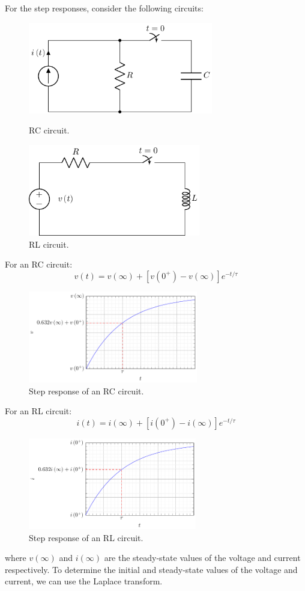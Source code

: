 \documentclass{article}
\begin{document}
For the step responses, consider the following circuits:
\begin{figure}[H]
    \centering
    \includegraphics[height = 4cm]{figures/rc_step.pdf}
    \caption{RC circuit.} %
    \includegraphics[height = 4cm]{figures/rl_step.pdf}
    \caption{RL circuit.} %
\end{figure}
For an RC circuit:
\begin{equation*}
    v\left( t \right) = v\left( \infty \right) + \left[ v\left( 0^{+} \right) - v\left( \infty \right) \right] e^{-t/\tau}
\end{equation*}
\begin{figure}[H]
    \centering
    \includegraphics[height = 4cm]{figures/rc_step_plot.pdf}
    \caption{Step response of an RC circuit.} %
\end{figure}
For an RL circuit:
\begin{equation*}
    i\left( t \right) = i\left( \infty \right) + \left[ i\left( 0^{+} \right) - i\left( \infty \right) \right] e^{-t/\tau}
\end{equation*}
\begin{figure}[H]
    \centering
    \includegraphics[height = 4cm]{figures/rl_step_plot.pdf}
    \caption{Step response of an RL circuit.} %
\end{figure}
where \(v\left( \infty \right)\) and \(i\left( \infty \right)\) are the steady-state values of the voltage and current respectively.
To determine the initial and steady-state values of the voltage and current, we can use the Laplace transform.
\end{document}
